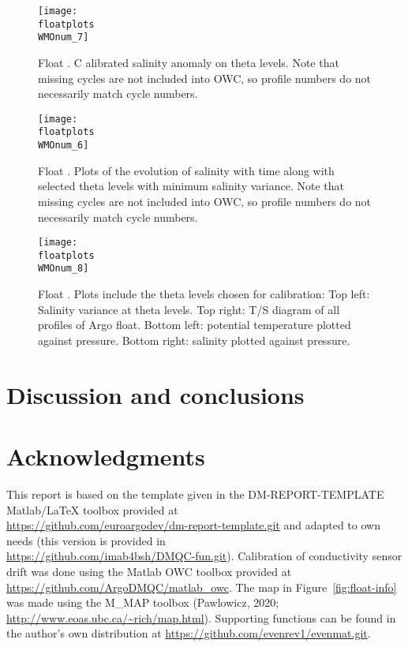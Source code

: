 \documentclass{article}
\begin{document}
\begin{figure}[p]
    \centering    
    \texttt{[image: \\floatplots\\WMOnum\_7]}
    \caption{Float \WMOnum.  C alibrated salinity anomaly on theta levels.
      Note that missing cycles are not included into OWC, so profile numbers do
      not necessarily match cycle numbers.}
    \label{CalibSalAnomOnTheta}
\end{figure}
\begin{figure}[p]
    \centering    
    \texttt{[image: \\floatplots\\WMOnum\_6]}
    \caption{Float \WMOnum. Plots of the evolution of salinity with time
      along with selected theta levels with minimum salinity variance.
      Note that missing cycles are not included into OWC, so profile numbers do
      not necessarily match cycle numbers.} 
    \label{SalErrOnTheta}
\end{figure}
\begin{figure}[p]
  \centerline{\texttt{[image: \\floatplots\\WMOnum\_8]}}
  \caption{Float \WMOnum. Plots include the theta levels chosen for
    calibration: Top left: Salinity variance at theta levels. Top right:
    T/S diagram of all profiles of Argo float. Bottom left: potential
    temperature plotted against pressure. Bottom right: salinity plotted
    against pressure.} 
  \label{Salinity_OWlevels}
\end{figure}




\FloatBarrier
\newpage
\section{Discussion and conclusions}\label{sec:discussion}






\section*{Acknowledgments}
This report is based on the template given in the DM-REPORT-TEMPLATE
Matlab/LaTeX toolbox provided at\\
\href{url}{https://github.com/euroargodev/dm-report-template.git} and
adapted to own needs (this version is provided in\\
\href{url}{https://github.com/imab4bsh/DMQC-fun.git}).  
%
Calibration of conductivity sensor drift was done using the Matlab OWC
toolbox provided at \href{url}{https://github.com/ArgoDMQC/matlab\_owc}.
%
The map in Figure~\ref{fig:float-info} was made using the M\_MAP toolbox
(Pawlowicz, 2020; \url{http://www.eoas.ubc.ca/~rich/map.html}).
%
Supporting functions can be found in the author's own distribution at
\href{url}{https://github.com/evenrev1/evenmat.git}.
\end{document}
